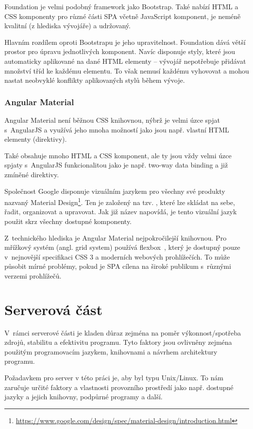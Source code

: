 Foundation je velmi podobný framework jako Bootstrap. Také nabízí HTML a CSS komponenty pro různé části SPA včetně JavaScript komponent, je neméně kvalitní (z hlediska vývojáře) a udržovaný.

Hlavním rozdílem oproti Bootstrapu je jeho upravitelnost. Foundation dává větší prostor pro úpravu jednotlivých komponent. Navíc disponuje styly, které jsou automaticky aplikované na dané HTML elementy -- vývojář nepotřebuje přidávat množství tříd ke každému elementu. To však nemusí každému vyhovovat a mohou nastat neobvyklé konflikty aplikovaných stylů během vývoje.

\subsubsection*{Angular Material}

Angular Material není běžnou CSS knihovnou, nýbrž je velmi úzce spjat s~AngularJS a využívá jeho mnoha možností jako jsou např. vlastní HTML elementy (direktivy).

Také obsahuje mnoho HTML a CSS komponent, ale ty jsou vždy velmi úzce spjaty s~AngularJS funkcionalitou jako je např. two-way data binding a již zmíněné direktivy. 

Společnost Google disponuje vizuálním jazykem pro všechny své produkty nazvaný Material Design\footnote{\url{https://www.google.com/design/spec/material-design/introduction.html}}. Ten je založený na tzv. , které lze skládat na sebe, řadit, organizovat a upravovat. Jak již název napovídá, je tento vizuální jazyk použit skrz všechny dostupné komponenty.

Z~technického hlediska je Angular Material nejpokročilejší knihovnou. Pro mřížkový systém (angl. grid system) používá flexbox~\cite{flexbox}, který je dostupný pouze v~nejnovější specifikaci CSS 3 a moderních webových prohlížečích. To může působit mírné problémy, pokud je SPA cílena na široké publikum s~různými verzemi prohlížečů.


\section{Serverová část}

V~rámci serverové části je kladen důraz zejména na poměr výkonnost/spotřeba zdrojů, stabilitu a efektivitu programu. Tyto faktory jsou ovlivněny zejména použitým programovacím jazykem, knihovnami a návrhem architektury programu.

Požadavkem pro server v této práci je, aby byl typu Unix/Linux. To nám zaručuje určité faktory a vlastnosti provozního prostředí jako např. dostupné jazyky a jejich knihovny, podpůrné programy a další.

